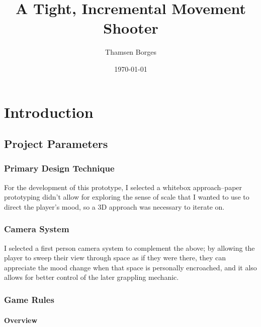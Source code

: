 \documentclass[letterpaper]{report}
\title{A Tight, Incremental Movement Shooter}
\author{Thamsen Borges}
\date{\today}
\begin{document}
\maketitle
\part{Introduction}
	\chapter{Project Parameters}
		\section{Primary Design Technique}
			For the development of this prototype, I selected a whitebox approach--paper prototyping didn't allow for exploring the sense of scale that I wanted to use to direct the player's mood, so a 3D approach was necessary to iterate on.
		\section{Camera System}
			I selected a first person camera system to complement the above; by allowing the player to sweep their view through space as if they were there, they can appreciate the mood change when that space is personally encroached, and it also allows for better control of the later grappling mechanic.
		\section{Game Rules}
			\subsection{Overview}
\end{document}
